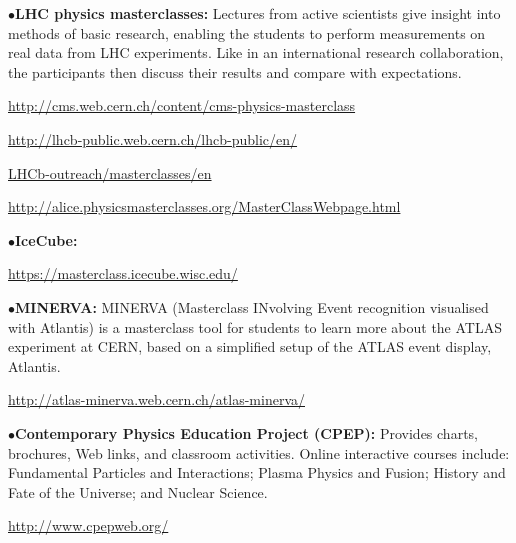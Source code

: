 \medskip

\item{$\bullet$}{\bf LHC physics masterclasses:}
Lectures from active scientists give insight into methods of basic research, enabling the students to perform measurements on real data from LHC experiments. Like in an international research collaboration, the participants then discuss their results and compare with expectations.
	\item{}\qquad\url{http://cms.web.cern.ch/content/cms-physics-masterclass}
	\item{}\qquad\url{http://lhcb-public.web.cern.ch/lhcb-public/en/}
	\item{}\qquad\qquad\url{LHCb-outreach/masterclasses/en}
	\item{}\qquad\url{http://alice.physicsmasterclasses.org/MasterClassWebpage.html}

\medskip

\item{$\bullet$}{\bf IceCube:}
	\item{}\qquad\url{https://masterclass.icecube.wisc.edu/}

\medskip

\item{$\bullet$}{\bf MINERVA:}
MINERVA (Masterclass INvolving Event recognition visualised with Atlantis) is a masterclass tool for students to learn more about the ATLAS experiment at CERN, based on a simplified setup of the ATLAS event display, Atlantis.
	\item{}\qquad\url{http://atlas-minerva.web.cern.ch/atlas-minerva/}

\medskip
\medskip


\item{$\bullet$}{\bf Contemporary Physics Education Project (CPEP):}
Provides charts, brochures, Web links, and classroom activities. Online interactive courses include: Fundamental Particles and Interactions; Plasma Physics and Fusion; History and Fate of the Universe; and Nuclear Science.
	\item{}\qquad\url{http://www.cpepweb.org/}




